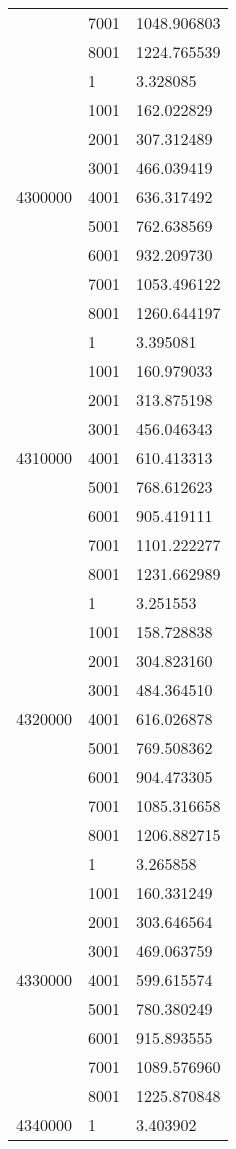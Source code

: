 \begin{table}[htb!]
\begin{tabular}{lll}
 & 7001 & 1048.906803 \\
 & 8001 & 1224.765539 \\
\multirow[c]{9}{*}{4300000} & 1 & 3.328085 \\
 & 1001 & 162.022829 \\
 & 2001 & 307.312489 \\
 & 3001 & 466.039419 \\
 & 4001 & 636.317492 \\
 & 5001 & 762.638569 \\
 & 6001 & 932.209730 \\
 & 7001 & 1053.496122 \\
 & 8001 & 1260.644197 \\
\multirow[c]{9}{*}{4310000} & 1 & 3.395081 \\
 & 1001 & 160.979033 \\
 & 2001 & 313.875198 \\
 & 3001 & 456.046343 \\
 & 4001 & 610.413313 \\
 & 5001 & 768.612623 \\
 & 6001 & 905.419111 \\
 & 7001 & 1101.222277 \\
 & 8001 & 1231.662989 \\
\multirow[c]{9}{*}{4320000} & 1 & 3.251553 \\
 & 1001 & 158.728838 \\
 & 2001 & 304.823160 \\
 & 3001 & 484.364510 \\
 & 4001 & 616.026878 \\
 & 5001 & 769.508362 \\
 & 6001 & 904.473305 \\
 & 7001 & 1085.316658 \\
 & 8001 & 1206.882715 \\
\multirow[c]{9}{*}{4330000} & 1 & 3.265858 \\
 & 1001 & 160.331249 \\
 & 2001 & 303.646564 \\
 & 3001 & 469.063759 \\
 & 4001 & 599.615574 \\
 & 5001 & 780.380249 \\
 & 6001 & 915.893555 \\
 & 7001 & 1089.576960 \\
 & 8001 & 1225.870848 \\
\multirow[c]{9}{*}{4340000} & 1 & 3.403902 \\

\end{tabular}
\end{table}
